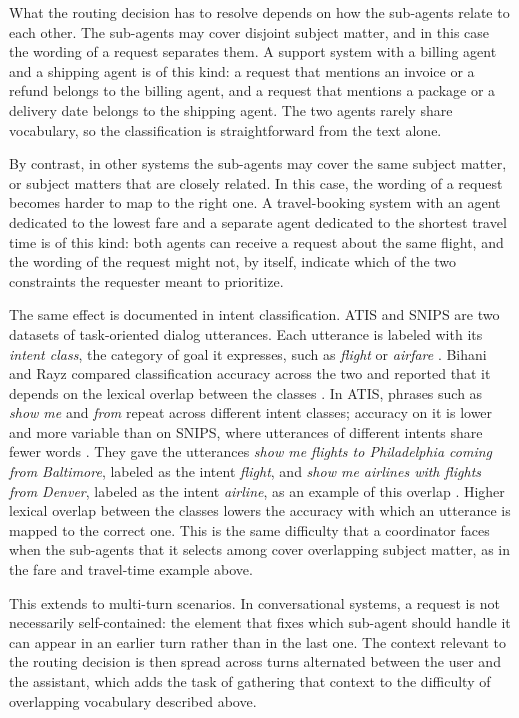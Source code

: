 What the routing decision has to resolve depends on how the sub-agents relate to each other. The sub-agents may cover disjoint subject matter, and in this case the wording of a request separates them. A support system with a billing agent and a shipping agent is of this kind: a request that mentions an invoice or a refund belongs to the billing agent, and a request that mentions a package or a delivery date belongs to the shipping agent. The two agents rarely share vocabulary, so the classification is straightforward from the text alone.

By contrast, in other systems the sub-agents may cover the same subject matter, or subject matters that are closely related. In this case, the wording of a request becomes harder to map to the right one. A travel-booking system with an agent dedicated to the lowest fare and a separate agent dedicated to the shortest travel time is of this kind: both agents can receive a request about the same flight, and the wording of the request might not, by itself, indicate which of the two constraints the requester meant to prioritize.

The same effect is documented in intent classification. ATIS and SNIPS are two datasets of task-oriented dialog utterances. Each utterance is labeled with its \emph{intent class}, the category of goal it expresses, such as \emph{flight} or \emph{airfare} \cite{bihaniFuzzyClassificationMultiintent2021}. Bihani and Rayz compared classification accuracy across the two and reported that it depends on the lexical overlap between the classes \cite{bihaniFuzzyClassificationMultiintent2021}. In ATIS, phrases such as \emph{show me} and \emph{from} repeat across different intent classes; accuracy on it is lower and more variable than on SNIPS, where utterances of different intents share fewer words \cite{bihaniFuzzyClassificationMultiintent2021}. They gave the utterances \emph{show me flights to Philadelphia coming from Baltimore}, labeled as the intent \emph{flight}, and \emph{show me airlines with flights from Denver}, labeled as the intent \emph{airline}, as an example of this overlap \cite{bihaniFuzzyClassificationMultiintent2021}. Higher lexical overlap between the classes lowers the accuracy with which an utterance is mapped to the correct one. This is the same difficulty that a coordinator faces when the sub-agents that it selects among cover overlapping subject matter, as in the fare and travel-time example above.

This extends to multi-turn scenarios. In conversational systems, a request is not necessarily self-contained: the element that fixes which sub-agent should handle it can appear in an earlier turn rather than in the last one. The context relevant to the routing decision is then spread across turns alternated between the user and the assistant, which adds the task of gathering that context to the difficulty of overlapping vocabulary described above.

